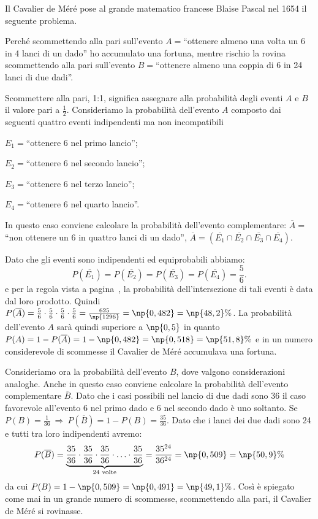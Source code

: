 Il Cavalier de Méré pose al grande matematico francese Blaise Pascal nel 1654 il seguente problema.
\begin{problema}
Perché scommettendo alla pari sull'evento $A=$``ottenere almeno una volta un 6 in 4 lanci di un dado'' ho accumulato una fortuna, mentre rischio la rovina scommettendo alla pari sull'evento $B=$``ottenere almeno una coppia di 6 in 24 lanci di due dadi''.
\end{problema}
Scommettere alla pari, 1:1, significa assegnare alla probabilità degli eventi $A$ e $B$ il valore pari a $\frac 1 2$.
Consideriamo la probabilità dell'evento $A$ composto dai seguenti quattro eventi indipendenti ma non incompatibili
\begin{itemize*}
\item $E_1=$``ottenere 6 nel primo lancio'';
\item $E_2=$``ottenere 6 nel secondo lancio'';
\item $E_3=$``ottenere 6 nel terzo lancio'';
\item $E_4=$``ottenere 6 nel quarto lancio''.
\end{itemize*}
In questo caso conviene calcolare la probabilità dell'evento complementare: $\overline A=$``non ottenere un 6 in quattro lanci di un dado'', $\overline A=(\overline{E_1}\cap \overline{E_2}\cap \overline{E_3}\cap \overline{E_4})$.

Dato che gli eventi sono indipendenti ed equiprobabili abbiamo: \[ P(\overline{E_1})=P(\overline{E_2})=P(\overline{E_3})=P(\overline{E_4})=\frac 5 6. \]
e per la regola vista a pagina~\pageref{reg:probabilita_intersezione_eventi_indipendenti}, la probabilità dell'intersezione di tali eventi è data dal loro prodotto. Quindi $P(\overline A)=\frac 5 6\cdot \frac 5 6\cdot \frac 5 6\cdot \frac 5 6=\frac{625}{\np{1296}}=\np{0,482}=\np{48,2}\%$.
La probabilità dell'evento $A$ sarà quindi superiore a $\np{0,5}$ in quanto $P(A)=1-P(\overline A)=1-\np{0,482}=\np{0,518}=\np{51,8}\%$ e in un numero considerevole di scommesse il Cavalier de Méré accumulava una fortuna.

Consideriamo ora la probabilità dell'evento $B$, dove valgono considerazioni analoghe. Anche in questo caso conviene calcolare la probabilità dell'evento complementare $\overline B$. Dato che i casi possibili nel lancio di due dadi sono 36 il caso favorevole all'evento 6 nel primo dado e 6 nel secondo dado è uno soltanto. Se $P(B)=\frac 1{36} \:\Rightarrow\: P(\overline B)=1-P(B)=\frac{35}{36}$. Dato che i lanci dei due dadi sono 24 e tutti tra loro indipendenti avremo:
\[ P(\overline B)=\underbrace{\frac{35}{36}\cdot\frac{35}{36}\cdot\frac{35}{36}\cdot\ldots\cdot\frac{35}{36}}_{24\text{ volte}}=\frac{35^{24}}{36^{24}}=\np{0,509}=\np{50,9}\% \]
da cui $P(B)=1-\np{0,509}=\np{0,491}=\np{49,1}\%$. Così è spiegato come mai in un grande numero di scommesse, scommettendo alla pari, il Cavalier de Méré si rovinasse.

